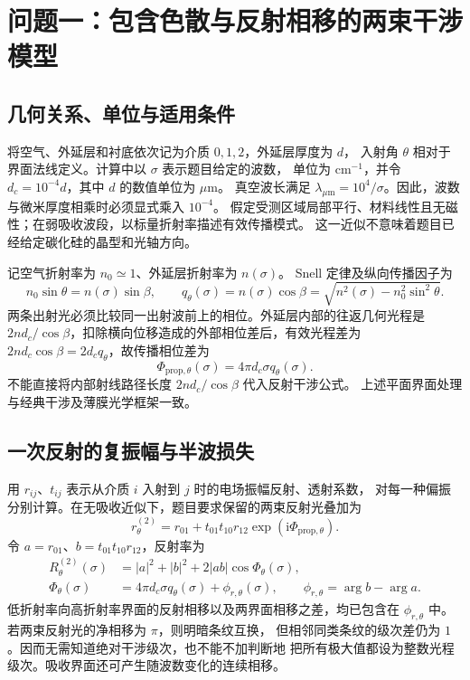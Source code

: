 \section{问题一：包含色散与反射相移的两束干涉模型}
\label{sec:single-theory}

\subsection{几何关系、单位与适用条件}
将空气、外延层和衬底依次记为介质 $0,1,2$，外延层厚度为 $d$，
入射角 $\theta$ 相对于界面法线定义。计算中以 $\sigma$ 表示题目给定的波数，
单位为 $\mathrm{cm}^{-1}$，并令 $d_c=10^{-4}d$，其中 $d$ 的数值单位为 $\mu\mathrm{m}$。
真空波长满足 $\lambda_{\mu\mathrm m}=10^4/\sigma$。因此，波数与微米厚度相乘时必须显式乘入 $10^{-4}$。
假定受测区域局部平行、材料线性且无磁性；在弱吸收波段，以标量折射率描述有效传播模式。
这一近似不意味着题目已经给定碳化硅的晶型和光轴方向。


记空气折射率为 $n_0\simeq1$、外延层折射率为 $n(\sigma)$。
Snell 定律及纵向传播因子为
\begin{equation}
 n_0\sin\theta=n(\sigma)\sin\beta,\qquad
 q_\theta(\sigma)=n(\sigma)\cos\beta
 =\sqrt{n^2(\sigma)-n_0^2\sin^2\theta}.
 \label{eq:snell-q}
\end{equation}
两条出射光必须比较同一出射波前上的相位。外延层内部的往返几何光程是
$2nd_c/\cos\beta$，扣除横向位移造成的外部相位差后，有效光程差为
$2nd_c\cos\beta=2d_cq_\theta$，故传播相位差为
\begin{equation}
 \Phi_{\mathrm{prop},\theta}(\sigma)=4\pi d_c\sigma q_\theta(\sigma).
 \label{eq:prop-phase}
\end{equation}
不能直接将内部射线路径长度 $2nd_c/\cos\beta$ 代入反射干涉公式。
上述平面界面处理与经典干涉及薄膜光学框架一致\cite{BornWolf1999,Byrnes2016}。

\subsection{一次反射的复振幅与半波损失}
用 $r_{ij}$、$t_{ij}$ 表示从介质 $i$ 入射到 $j$ 时的电场振幅反射、透射系数，
对每一种偏振分别计算。在无吸收近似下，题目要求保留的两束反射光叠加为
\begin{equation}
 r^{(2)}_\theta=r_{01}+t_{01}t_{10}r_{12}
 \exp\!\left(\mathrm{i}\Phi_{\mathrm{prop},\theta}\right).
 \label{eq:two-beam-amp}
\end{equation}
令 $a=r_{01}$、$b=t_{01}t_{10}r_{12}$，反射率为
\begin{align}
 R^{(2)}_\theta(\sigma)
 &=|a|^2+|b|^2+2|a b|\cos\Phi_\theta(\sigma),\\
 \Phi_\theta(\sigma)
 &=4\pi d_c\sigma q_\theta(\sigma)+\phi_{r,\theta}(\sigma),\qquad
 \phi_{r,\theta}=\arg b-\arg a.
 \label{eq:two-beam-phase}
\end{align}
低折射率向高折射率界面的反射相移以及两界面相移之差，均已包含在
$\phi_{r,\theta}$ 中。若两束反射光的净相移为 $\pi$，则明暗条纹互换，
但相邻同类条纹的级次差仍为 $1$。因而无需知道绝对干涉级次，也不能不加判断地
把所有极大值都设为整数光程级次。吸收界面还可产生随波数变化的连续相移。

